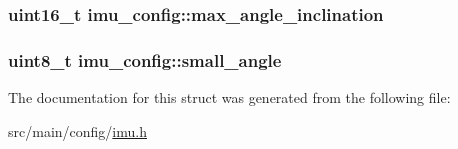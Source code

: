 \hypertarget{structimu__config_a270438820e28e7bccc465c5d3b771f7e}{
\subsubsection[{max\+\_\+angle\+\_\+inclination}]{\setlength{\rightskip}{0pt plus 5cm}uint16\+\_\+t imu\+\_\+config\+::max\+\_\+angle\+\_\+inclination}}\label{structimu__config_a270438820e28e7bccc465c5d3b771f7e}
\hypertarget{structimu__config_a32e3ee0909d545a8f9db86415346e865}{
\subsubsection[{small\+\_\+angle}]{\setlength{\rightskip}{0pt plus 5cm}uint8\+\_\+t imu\+\_\+config\+::small\+\_\+angle}}\label{structimu__config_a32e3ee0909d545a8f9db86415346e865}


The documentation for this struct was generated from the following file\+:\begin{DoxyCompactItemize}
\item 
src/main/config/\hyperlink{config_2imu_8h}{imu.\+h}\end{DoxyCompactItemize}
